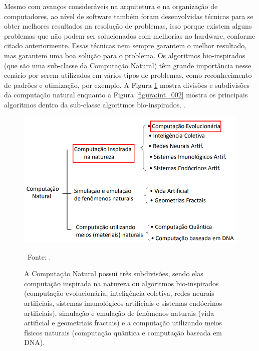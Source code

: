 Mesmo com avanços consideráveis na arquitetura e na organização de computadores, ao nível de software também foram desenvolvidas técnicas para se obter melhores resultados na resolução de problemas, isso porque existem alguns problemas que não podem ser solucionados com melhorias no hardware, conforme citado anteriormente. Essas técnicas nem sempre garantem o melhor resultado, mas garantem uma boa solução para o problema. Os algoritmos bio-inspirados (que são uma sub-classe da Computação Natural) têm grande importância nesse cenário por serem utilizados em vários tipos de problemas, como reconhecimento de padrões e otimização, por exemplo. A Figura \ref{figura:int_001} mostra divisões e subdivisões da computação natural enquanto a Figura \ref{figura:int_002} mostra os principais algoritmos dentro da sub-classe algoritmos bio-inspirados. \cite{rossi:2009:ajuste}.

\begin{figure}[htb]  
	\centering
	\includegraphics[width=.8\textwidth]{figuras/int_001}
	\caption[Computação Natural]{A Computação Natural possui três subdivisões, sendo elas computação inspirada na natureza ou algoritmos bio-inspirados (computação evolucionária, inteligência coletiva, redes neurais artificiais, sistemas imunológicos artificiais e sistemas endócrinos artificiais), simulação e emulação de fenômenos naturais (vida artificial e geometriais fractais) e a computação utilizando meios físicos naturais (computação quântica e computação baseada em DNA).}
	\ Fonte: \cite{pappa:2015:conceitos}. 
	\label{figura:int_001}
\end{figure}

